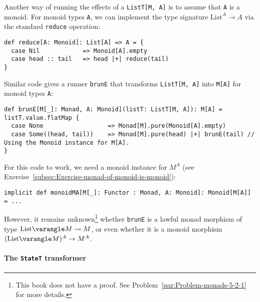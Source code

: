 Another way of running the effects of a \lstinline!ListT[M, A]! is
to assume that \lstinline!A! is a monoid. For monoid types \lstinline!A!,
we can implement the type signature $\text{List}^{A}\rightarrow A$
via the standard \lstinline!reduce! operation:
\begin{lstlisting}
def reduce[A: Monoid]: List[A] => A = {
  case Nil            => Monoid[A].empty
  case head :: tail   => head |+| reduce(tail)
}
\end{lstlisting}
Similar code gives a runner \lstinline!brunE! that transforms \lstinline!ListT[M, A]!
into \lstinline!M[A]! for monoid types \lstinline!A!:
\begin{lstlisting}
def brunE[M[_]: Monad, A: Monoid](listT: ListT[M, A]): M[A] = listT.value.flatMap {
  case None                  => Monad[M].pure(Monoid[A].empty)
  case Some((head, tail))    => Monad[M].pure(head) |+| brunE(tail) // Using the Monoid instance for M[A].
}
\end{lstlisting}
For this code to work, we need a monoid instance for $M^{A}$ (see
Exercise~\ref{subsec:Exercise-monad-of-monoid-is-monoid}):
\begin{lstlisting}
implicit def monoidMA[M[_]: Functor : Monad, A: Monoid]: Monoid[M[A]] = ...
\end{lstlisting}
However, it remains unknown\footnote{This book does not have a proof. See Problem~\ref{par:Problem-monads-5-2-1}
for more details.} whether \lstinline!brunE! is a lawful monad morphism of type $\text{List}\varangle M\leadsto M$,
or even whether it is a monoid morphism $(\text{List}\varangle M)^{A}\rightarrow M^{A}$.

\paragraph{The \texttt{StateT} transformer}


